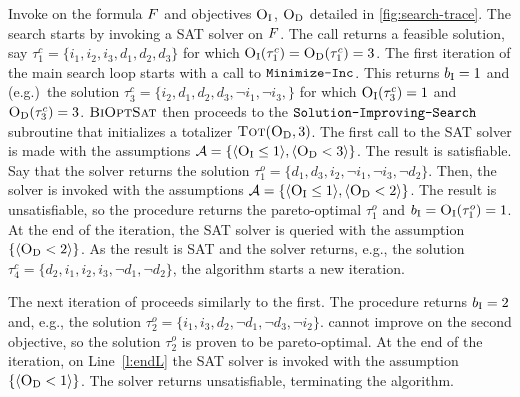 \begin{example}\label{ex:main-iteration}
Invoke \algname{} on the formula $F$  and objectives $\textsc{O}_{\text{I}}$, $\textsc{O}_{\text{D}}$ detailed in \cref{fig:search-trace}. 
The search starts by invoking a SAT solver on $F$. The call returns a feasible solution, say  $\tau^c_1 = \{i_1, i_2, i_3, d_1, d_2, d_3\}$ 
for which  $\textsc{O}_{\text{I}}(\tau^c_1) = \textsc{O}_{\text{D}}(\tau^c_1) = 3$. 
The first iteration of the main search loop starts with a call to $\texttt{Minimize-\allowbreak{}Inc}$. This returns $b_{\text{I}} = 1$ and (e.g.)\ 
the solution $\tau^c_3 = \{ i_2, d_1, d_2, d_3, \lnot i_1, \lnot i_3,\}$ 
for which $\textsc{O}_{\text{I}}(\tau^c_3) = 1$ and $\textsc{O}_{\text{D}}(\tau^c_3) = 3$. $\textsc{BiOptSat}$ then proceeds to the $\texttt{Solution-\allowbreak{}Improving-\allowbreak{}Search}$ subroutine that initializes a  totalizer $\textsc{Tot}(\textsc{O}_{\text{D}}, 3)$.
The first call to the SAT solver is made with the assumptions $\mathcal{A} = \{ \langle \textsc{O}_{\text{I}} \leq 1 \rangle, \langle \textsc{O}_{\text{D}} < 3 \rangle \}$. The result is satisfiable.
Say that the solver returns the solution
 $\tau^o_1 = \{d_1, d_3, i_2, \lnot i_1, \lnot i_3, \lnot d_2\}$. Then, the solver is invoked with the assumptions 
$\mathcal{A} =  \{ \langle \textsc{O}_{\text{I}} \leq 1 \rangle, \langle \textsc{O}_{\text{D}} < 2 \rangle \}$.
The result is unsatisfiable, so the procedure returns the pareto-optimal $\tau^o_1$ and $b_{\text{I}} = \textsc{O}_{\text{I}}(\tau^o_1) = 1$.
At the end of the iteration, the SAT solver is queried with the assumption $\{ \langle \textsc{O}_{\text{D}} < 2 \rangle \}$.
As the result is SAT and the solver returns, e.g., the solution $\tau^c_4 = \{ d_2, i_1, i_2, i_3, \lnot d_1, \lnot d_2 \}$,
the algorithm starts a new iteration.

The next iteration of \algname{} proceeds similarly to the first. The procedure \Min{} returns $b_{\text{I}} = 2$ and, e.g.,
the solution $\tau^o_2 = \{ i_1, i_3, d_2, \lnot d_1, \lnot d_3, \lnot i_2\}$.
\Simpr{} cannot improve on the second objective, so the solution $\tau^o_2$ is proven to be pareto-optimal.
At the end of the iteration, on Line~\ref{l:endL} the SAT solver is invoked with the assumption $\{\langle \textsc{O}_{\text{D}} < 1 \rangle\}$. The solver returns unsatisfiable,
terminating the algorithm. 
\end{example}

